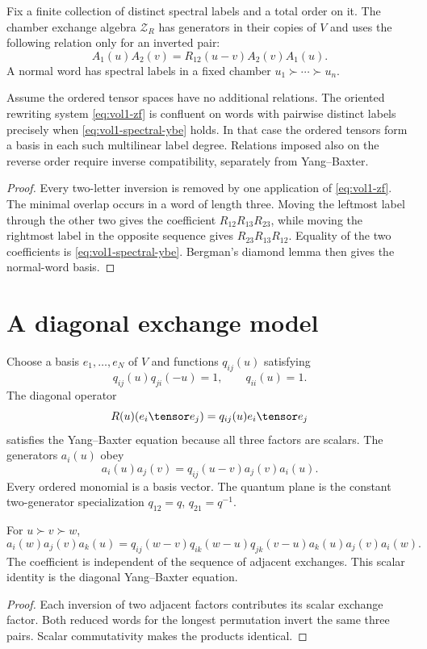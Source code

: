 \begin{definition}
Fix a finite collection of distinct spectral labels and a total order on it.
The chamber exchange algebra $\mathcal Z_R$ has generators in their copies of $V$ and uses the following relation only for an inverted pair:
\begin{equation}\label{eq:vol1-zf}
 A_1(u)A_2(v)=R_{12}(u-v)A_2(v)A_1(u).
\end{equation}
A normal word has spectral labels in a fixed chamber $u_1\succ\cdots\succ u_n$.
\end{definition}

\begin{theorem}
Assume the ordered tensor spaces have no additional relations.
The oriented rewriting system \eqref{eq:vol1-zf} is confluent on words with pairwise distinct labels precisely when \eqref{eq:vol1-spectral-ybe} holds.
In that case the ordered tensors form a basis in each such multilinear label degree.
Relations imposed also on the reverse order require inverse compatibility, separately from Yang--Baxter.
\end{theorem}
\begin{proof}
Every two-letter inversion is removed by one application of \eqref{eq:vol1-zf}.  The minimal overlap occurs in a word of length three.  Moving the leftmost label through the other two gives the coefficient
$R_{12}R_{13}R_{23}$, while moving the rightmost label in the opposite sequence gives $R_{23}R_{13}R_{12}$.  Equality of the two coefficients is \eqref{eq:vol1-spectral-ybe}.  Bergman's diamond lemma then gives the normal-word basis.
\end{proof}

\section{A diagonal exchange model}
Choose a basis $e_1,\ldots,e_N$ of $V$ and functions $q_{ij}(u)$ satisfying
\[
 q_{ij}(u)q_{ji}(-u)=1,
 \qquad q_{ii}(u)=1.
\]
The diagonal operator
\[
 R(u)(e_i\tensor e_j)=q_{ij}(u)e_i\tensor e_j
\]
satisfies the Yang--Baxter equation because all three factors are scalars.  The generators $a_i(u)$ obey
\[
 a_i(u)a_j(v)=q_{ij}(u-v)a_j(v)a_i(u).
\]
Every ordered monomial is a basis vector.  The quantum plane is the constant two-generator specialization $q_{12}=q$, $q_{21}=q^{-1}$.

\begin{calculation}
For $u\succ v\succ w$,
\[
 a_i(w)a_j(v)a_k(u)
 =q_{ij}(w-v)q_{ik}(w-u)q_{jk}(v-u)
  a_k(u)a_j(v)a_i(w).
\]
The coefficient is independent of the sequence of adjacent exchanges.  This scalar identity is the diagonal Yang--Baxter equation.
\end{calculation}
\begin{proof}
Each inversion of two adjacent factors contributes its scalar exchange factor.  Both reduced words for the longest permutation invert the same three pairs.  Scalar commutativity makes the products identical.
\end{proof}


